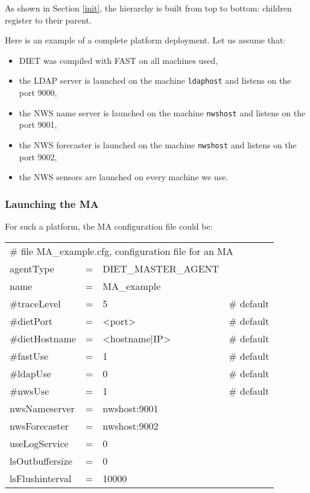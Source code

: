 As shown in Section \ref{init}, the hierarchy is built from top to
bottom: children register to their parent.

Here is an example of a complete platform deployment. Let us assume
that:

\begin{itemize}
\item DIET was compiled with FAST on all machines used,
\item the LDAP server is launched on the machine \texttt{ldaphost} and listens
  on the port 9000,
\item the NWS name server is launched on the machine \texttt{nwshost} and
  listens on the port 9001,
\item the NWS forecaster is launched on the machine \texttt{nwshost} and
  listens on the port 9002,
\item the NWS sensors are launched on every machine we use.
\end{itemize}


\subsubsection{Launching the MA}

For such a platform, the MA configuration file could be:
\tt
\begin{center}
 \footnotesize
 \begin{tabular}{lcll}
  \multicolumn{4}{l}{\# file MA\_example.cfg, configuration file for an MA}\\
  agentType     &=&DIET\_MASTER\_AGENT&\\
  name          &=&MA\_example        &\\
  \#traceLevel  &=&5                  &\# default\\
  \#dietPort    &=&<port>             &\# default\\
  \#dietHostname&=&<hostname|IP>      &\# default\\
  \#fastUse     &=&1                  &\# default\\
  \#ldapUse     &=&0                  &\# default\\
  \#nwsUse      &=&1                  &\# default\\
  nwsNameserver &=&nwshost:9001       &\\
  nwsForecaster &=&nwshost:9002       &\\
  useLogService &=& 0                 &\\
  lsOutbuffersize &=& 0               &\\
  lsFlushinterval &=& 10000           &\\
 \end{tabular}
\end{center}
\rm


